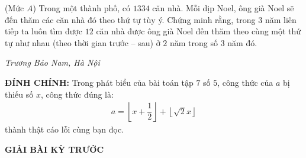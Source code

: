 \begin{multicols}{2}
	(Mức $A$) Trong một thành phố, có $1334$ căn nhà. Mỗi dịp Noel, ông già Noel sẽ đến thăm các căn nhà đó theo thứ tự tùy ý. Chứng minh rằng, trong $3$ năm liên tiếp ta luôn tìm được $12$ căn nhà được ông già Noel đến thăm theo cùng một thứ tự như nhau (theo thời gian trước -- sau) ở $2$ năm trong số $3$ năm đó. 
	\begin{flushright}
		\textit{Trương Bảo Nam, Hà Nội}
	\end{flushright}
	\textbf{\color{thachthuctoanhoc}ĐÍNH CHÍNH:}
	Trong phát biểu của bài toán {} tập $7$ số $5$, công thức của $a$ bị thiếu số $x$, công thức đúng là:
	\begin{align*}
		a=\left\lfloor x+\dfrac12\right\rfloor+\left\lfloor\sqrt{2}x\right\rfloor
	\end{align*} thành thật cáo lỗi cùng bạn đọc.
\end{multicols}
\centerline{{\large{\textbf{\color{thachthuctoanhoc}GIẢI BÀI KỲ TRƯỚC}}}}
\vspace*{-5pt}
